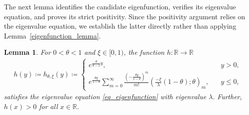 \documentclass[10pt,a4paper]{amsart}
\newcommand{\R}{\mathbb{R}} %
\newcommand{\1}{\mathds{1}}
\newtheorem{Lemma}[definition]{Lemma}
\begin{document}
The next lemma identifies the candidate eigenfunction, verifies its
eigenvalue equation, and proves its strict positivity. Since the
positivity argument relies on the eigenvalue equation, we establish
the latter directly rather than applying
Lemma~\ref{eigenfunction_lemma}.
\begin{Lemma}\label{h_eigenfct_pos_theta}
    For $0<\theta<1$ and $\xi\in[0,1)$, the function $h:\R\to\R$
    \begin{align}\label{def_h_pos_theta_2}
     h(y)\coloneqq h_{\theta,\xi}(y)\coloneqq  \begin{cases}
          e^{\frac{\theta}{\theta-1}y},~~~&y>0,
          \\e^{\frac{\theta y}{1-\theta}}\sum_{m=0}^\infty\frac{\left(-\frac{\theta y}{1-\theta}\right)^m}{m!}\left(\frac{-\xi}{\lambda}(1-\theta);\theta\right)_m,~~~~&y\le 0,
      \end{cases}
  \end{align}
  satisfies the eigenvalue equation \eqref{eq_eigenfunction} with eigenvalue $\lambda$. Further,  $h(x)>0$ for all $x\in\R$.
\end{Lemma}
\end{document}
